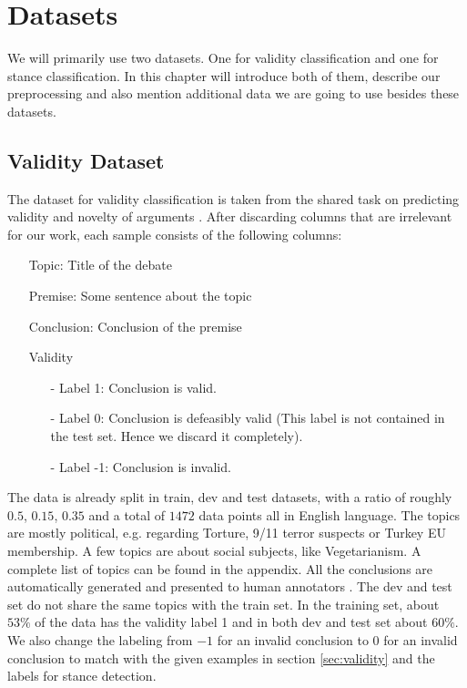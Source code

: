 \section{Datasets}

We will primarily use two datasets. One for validity classification and one for stance classification. In this chapter will introduce both of them, describe our preprocessing and also mention additional data we are going to use besides these datasets.

\subsection{Validity Dataset}

The dataset for validity classification is taken from the shared task on predicting validity and novelty of arguments \cite{argsvalidnovel2022}. After discarding columns that are irrelevant for our work, each sample consists of the following columns:
\begin{enumerate}
	\item[\textbullet] Topic: Title of the debate
	\item[\textbullet] Premise: Some sentence about the topic
	\item[\textbullet] Conclusion: Conclusion of the premise
	\item[\textbullet] Validity
	\begin{enumerate}
		\item[-] Label 1: Conclusion is valid.
		\item[-] Label 0: Conclusion is defeasibly valid (This label is not contained in the test set. Hence we discard it completely).
		\item[-] Label -1: Conclusion is invalid.
	\end{enumerate}
\end{enumerate}
The data is already split in train, dev and test datasets, with a ratio of roughly $0.5$, $0.15$, $0.35$ and a total of $1472$ data points all in English language. The topics are mostly political, e.g. regarding Torture, 9/11 terror suspects or Turkey EU membership. A few topics are about social subjects, like Vegetarianism. A complete list of topics can be found in the appendix. All the conclusions are automatically generated and presented to human annotators \cite{argsvalidnovel2022}. The dev and test set do not share the same topics with the train set. In the training set, about $53\%$ of the data has the validity label 1 and in both dev and test set about $60\%$. We also change the labeling from $-1$ for an invalid conclusion to $0$ for an invalid conclusion to match with the given examples in section \ref{sec:validity} and the labels for stance detection.

